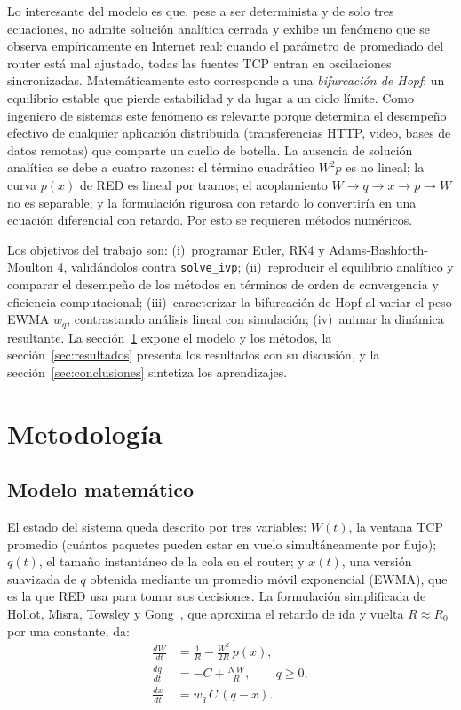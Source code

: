 \documentclass[10pt,a4paper]{article}
\begin{document}
Lo interesante del modelo es que, pese a ser determinista y de solo tres
ecuaciones, no admite solución analítica cerrada y exhibe un fenómeno
que se observa empíricamente en Internet real: cuando el parámetro de
promediado del router está mal ajustado, todas las fuentes TCP entran en
oscilaciones sincronizadas. Matemáticamente esto corresponde a una
\textit{bifurcación de Hopf}: un equilibrio estable que pierde
estabilidad y da lugar a un ciclo límite. Como ingeniero de sistemas
este fenómeno es relevante porque determina el desempeño efectivo de
cualquier aplicación distribuida (transferencias HTTP, video, bases de
datos remotas) que comparte un cuello de botella. La ausencia de
solución analítica se debe a cuatro razones: el término cuadrático
$W^2 p$ es no lineal; la curva $p(x)$ de RED es lineal por tramos; el
acoplamiento $W\to q\to x\to p\to W$ no es separable; y la formulación
rigurosa con retardo lo convertiría en una ecuación diferencial con
retardo. Por esto se requieren métodos numéricos.

Los objetivos del trabajo son: (i)~programar Euler, RK4 y
Adams-Bashforth-Moulton 4, validándolos contra \texttt{solve\_ivp};
(ii)~reproducir el equilibrio analítico y comparar el desempeño de los
métodos en términos de orden de convergencia y eficiencia computacional;
(iii)~caracterizar la bifurcación de Hopf al variar el peso EWMA $w_q$,
contrastando análisis lineal con simulación; (iv)~animar la dinámica
resultante. La sección~\ref{sec:metodologia} expone el modelo y los
métodos, la sección~\ref{sec:resultados} presenta los resultados con su
discusión, y la sección~\ref{sec:conclusiones} sintetiza los
aprendizajes.

\section{Metodología}
\label{sec:metodologia}

\subsection{Modelo matemático}

El estado del sistema queda descrito por tres variables: $W(t)$, la
ventana TCP promedio (cuántos paquetes pueden estar en vuelo
simultáneamente por flujo); $q(t)$, el tamaño instantáneo de la cola en
el router; y $x(t)$, una versión suavizada de $q$ obtenida mediante un
promedio móvil exponencial (EWMA), que es la que RED usa para tomar sus
decisiones. La formulación simplificada de Hollot, Misra, Towsley y
Gong~\cite{hollot2002}, que aproxima el retardo de ida y vuelta
$R\approx R_0$ por una constante, da:
\begin{subequations}
\label{eq:mgt}
\begin{align}
\frac{dW}{dt} &= \frac{1}{R} - \frac{W^2}{2R}\, p(x),\\
\frac{dq}{dt} &= -C + \frac{N\,W}{R}, \qquad q\geq 0,\\
\frac{dx}{dt} &= w_q\, C\,(q-x).
\end{align}
\end{subequations}
\end{document}
